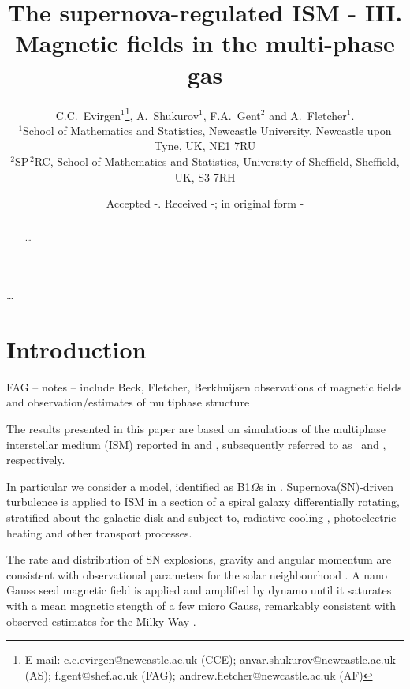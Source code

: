 \documentclass[useAMS,usenatbib]{mn2e}
\title[The supernova-regulated ISM - III. Magnetic fields in the multi-phase gas]{The supernova-regulated ISM - III. Magnetic fields in the multi-phase gas}
\author[C. C.~Evirgen, A.~Shukurov, F.A. Gent and A.~Fletcher]{C.C.~Evirgen$^{1}$\thanks{E-mail:
c.c.evirgen@newcastle.ac.uk (CCE); anvar.shukurov@newcastle.ac.uk (AS); 
f.gent@shef.ac.uk (FAG); andrew.fletcher@newcastle.ac.uk (AF)}, A.~Shukurov$^{1}$, F.A.~Gent$^{2}$ and A.~Fletcher$^{1}$.\\
$^{1}$School of Mathematics and Statistics, Newcastle University,
Newcastle upon Tyne, UK, NE1 7RU\\
$^{2}$SP$^{\,2}$\!RC, School of Mathematics and Statistics, University of Sheffield, 
Sheffield, UK, S3 7RH}
\begin{document}
\newcommand{\bvec}[1]{\boldsymbol{#1}}
\newcommand{\avg}[1]{\left<\bvec{#1}\right>_{l}}
\date{Accepted -. Received -; in original form -}

\pagerange{\pageref{firstpage}--\pageref{lastpage}} 

\maketitle

\label{firstpage}

\begin{abstract}
\ldots 
\end{abstract}

\begin{keywords}
\ldots
\end{keywords}

\section{Introduction}

FAG -- notes -- include Beck, Fletcher, Berkhuijsen observations of magnetic 
fields \citep{BAH13, MNR18065} and observation/estimates of multiphase structure 
\citep{CS74,MO77}

The results presented in this paper are based on simulations of the multiphase 
interstellar medium (ISM) reported in \citet{GSFSM13} and \citet{GSSFM13}, 
subsequently referred to as \HD\, and \MHD, respectively.

In particular we consider a model, identified as B1$\Omega$s in \MHD.
Supernova(SN)-driven turbulence is applied to ISM in a section of a spiral
galaxy differentially rotating, stratified about the galactic disk and subject
to, radiative cooling \citep{Sarazin87,Wolfire95}, photoelectric heating
\citep{Wolfire95} and other transport processes.

The rate and distribution of SN explosions, gravity \citep{Kuijken89} and 
angular momentum are consistent with observational parameters for the solar neighbourhood \citep{F01}. A nano Gauss seed magnetic field is applied and amplified by dynamo until it saturates with a mean magnetic stength of a few micro Gauss, remarkably consistent with observed estimates for the Milky Way \citep{dummy}.
\end{document}
